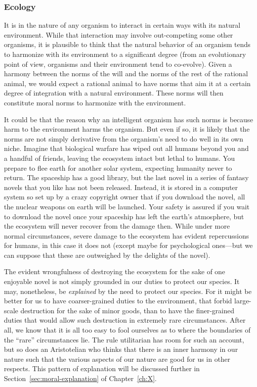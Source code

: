 \subsubsection{Ecology}
It is in the nature of any organism to interact in certain ways with its natural environment. While that interaction may 
involve out-competing some other organisms, it is plausible to think that the natural behavior of an organism tends to 
harmonize with its environment to a significant degree (from an evolutionary point of view, organisms and their environment tend 
to co-evolve). Given a harmony between the norms of the will and the norms of the rest of the rational animal, we would expect 
a rational animal to have norms that aim it at a certain degree of integration with a natural environment. These norms will then
constitute moral norms to harmonize with the environment.

It could be that the reason why an intelligent organism has such norms is because harm to the environment harms the organism.
But even if so, it is likely that the norms are not simply derivative from the organism's need to do well in its own 
niche. Imagine that biological warfare has wiped out all humans beyond you and a handful of friends, leaving the ecosystem 
intact but lethal to humans. You prepare to flee earth for another solar system, expecting humanity never to return. 
The spaceship has a good library, but the last novel in a series of fantasy novels that you like has not been released.
Instead, it is stored in a computer system so set up by a crazy copyright owner that if you download the novel, all the 
nuclear weapons on earth will be launched. Your safety is assured if you wait to download the novel once your spaceship has 
left the earth's atmosphere, but the ecosystem will never recover from the damage then. While under more normal circumstances,
severe damage to the ecosystem has evident repercussions for humans, in this case it does not (except maybe for psychological
ones---but we can suppose that these are outweighed by the delights of the novel). 

The evident wrongfulness of destroying the ecosystem for the sake of one enjoyable novel is not simply grounded in our duties to 
protect our species. It may, nonetheless, be \textit{explained} by the need to protect our species. For it might be better for 
us to have coarser-grained duties to the environment, that forbid large-scale destruction for the sake of minor goods, than to 
have the finer-grained duties that would allow such destruction in extremely rare circumstances. After all, we know that it is 
all too easy to fool ourselves as to where the boundaries of the ``rare'' circumstances lie. The rule utilitarian has room for 
such an account, but so does an Aristotelian who thinks that there is an inner harmony in our nature such that the various 
aspects of our nature are good for us in other respects. This pattern of explanation will be discussed further in Section~\ref{sec:moral-explanation}
of Chapter~\ref{ch:X}.

